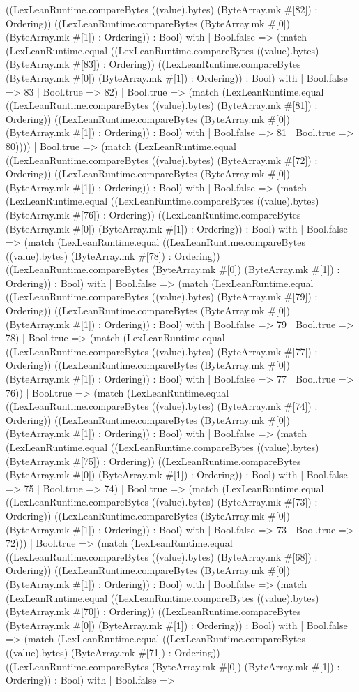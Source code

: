 \documentclass[11pt]{article}
\begin{document}
((LexLeanRuntime.compareBytes ((value).bytes) (ByteArray.mk \#[82]) : Ordering)) ((LexLeanRuntime.compareBytes (ByteArray.mk \#[0]) (ByteArray.mk \#[1]) : Ordering)) : Bool) with | Bool.false => (match (LexLeanRuntime.equal ((LexLeanRuntime.compareBytes ((value).bytes) (ByteArray.mk \#[83]) : Ordering)) ((LexLeanRuntime.compareBytes (ByteArray.mk \#[0]) (ByteArray.mk \#[1]) : Ordering)) : Bool) with | Bool.false => 83 | Bool.true => 82) | Bool.true => (match (LexLeanRuntime.equal ((LexLeanRuntime.compareBytes ((value).bytes) (ByteArray.mk \#[81]) : Ordering)) ((LexLeanRuntime.compareBytes (ByteArray.mk \#[0]) (ByteArray.mk \#[1]) : Ordering)) : Bool) with | Bool.false => 81 | Bool.true => 80)))) | Bool.true => (match (LexLeanRuntime.equal ((LexLeanRuntime.compareBytes ((value).bytes) (ByteArray.mk \#[72]) : Ordering)) ((LexLeanRuntime.compareBytes (ByteArray.mk \#[0]) (ByteArray.mk \#[1]) : Ordering)) : Bool) with | Bool.false => (match (LexLeanRuntime.equal ((LexLeanRuntime.compareBytes ((value).bytes) (ByteArray.mk \#[76]) : Ordering)) ((LexLeanRuntime.compareBytes (ByteArray.mk \#[0]) (ByteArray.mk \#[1]) : Ordering)) : Bool) with | Bool.false => (match (LexLeanRuntime.equal ((LexLeanRuntime.compareBytes ((value).bytes) (ByteArray.mk \#[78]) : Ordering)) ((LexLeanRuntime.compareBytes (ByteArray.mk \#[0]) (ByteArray.mk \#[1]) : Ordering)) : Bool) with | Bool.false => (match (LexLeanRuntime.equal ((LexLeanRuntime.compareBytes ((value).bytes) (ByteArray.mk \#[79]) : Ordering)) ((LexLeanRuntime.compareBytes (ByteArray.mk \#[0]) (ByteArray.mk \#[1]) : Ordering)) : Bool) with | Bool.false => 79 | Bool.true => 78) | Bool.true => (match (LexLeanRuntime.equal ((LexLeanRuntime.compareBytes ((value).bytes) (ByteArray.mk \#[77]) : Ordering)) ((LexLeanRuntime.compareBytes (ByteArray.mk \#[0]) (ByteArray.mk \#[1]) : Ordering)) : Bool) with | Bool.false => 77 | Bool.true => 76)) | Bool.true => (match (LexLeanRuntime.equal ((LexLeanRuntime.compareBytes ((value).bytes) (ByteArray.mk \#[74]) : Ordering)) ((LexLeanRuntime.compareBytes (ByteArray.mk \#[0]) (ByteArray.mk \#[1]) : Ordering)) : Bool) with | Bool.false => (match (LexLeanRuntime.equal ((LexLeanRuntime.compareBytes ((value).bytes) (ByteArray.mk \#[75]) : Ordering)) ((LexLeanRuntime.compareBytes (ByteArray.mk \#[0]) (ByteArray.mk \#[1]) : Ordering)) : Bool) with | Bool.false => 75 | Bool.true => 74) | Bool.true => (match (LexLeanRuntime.equal ((LexLeanRuntime.compareBytes ((value).bytes) (ByteArray.mk \#[73]) : Ordering)) ((LexLeanRuntime.compareBytes (ByteArray.mk \#[0]) (ByteArray.mk \#[1]) : Ordering)) : Bool) with | Bool.false => 73 | Bool.true => 72))) | Bool.true => (match (LexLeanRuntime.equal ((LexLeanRuntime.compareBytes ((value).bytes) (ByteArray.mk \#[68]) : Ordering)) ((LexLeanRuntime.compareBytes (ByteArray.mk \#[0]) (ByteArray.mk \#[1]) : Ordering)) : Bool) with | Bool.false => (match (LexLeanRuntime.equal ((LexLeanRuntime.compareBytes ((value).bytes) (ByteArray.mk \#[70]) : Ordering)) ((LexLeanRuntime.compareBytes (ByteArray.mk \#[0]) (ByteArray.mk \#[1]) : Ordering)) : Bool) with | Bool.false => (match (LexLeanRuntime.equal ((LexLeanRuntime.compareBytes ((value).bytes) (ByteArray.mk \#[71]) : Ordering)) ((LexLeanRuntime.compareBytes (ByteArray.mk \#[0]) (ByteArray.mk \#[1]) : Ordering)) : Bool) with | Bool.false => 
\end{document}
